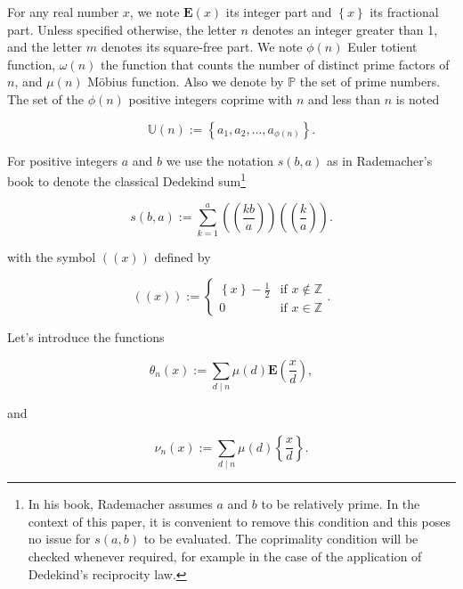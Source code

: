 \documentclass[a4paper,12pt]{article}
\newcommand{\IP}[1]{\textbf{E}\left( #1 \right)}
\newcommand{\FP}[1]{\left\{ #1 \right\}}
\newcommand{\setU}[1]{\mathbb{U}\left( #1 \right)}
\newcommand{\doublepariii}[1]{\left(\!\!\!\left(#1\right)\!\!\!\right)}
\newcommand{\doublepari}[1]{\left(\!\left(#1\right)\!\right)}
\begin{document}
For any real number $x$, we note $\IP{x}$ its integer part and $\FP{x}$ its fractional part. Unless specified otherwise, the letter $n$ denotes an integer greater than 1, and the letter $m$ denotes its square-free part. We note $\phi(n)$ Euler totient function, $\omega(n)$ the function that counts the number of distinct prime factors of $n$, and $\mu(n)$ Möbius function. Also we denote by $\mathbb{P}$ the set of prime numbers. The set of the $\phi(n)$ positive integers coprime with $n$ and less than $n$ is noted

\begin{equation}
\setU{n} := \left\{ a_1, a_2,\ldots, a_{\phi(n)} \right\}.
\label{eq:def_set_U_n}
\end{equation}

For positive integers $a$ and $b$ we use the notation $s(b,a)$ as in Rademacher's book \cite{rademacher1972dedekind} to denote the classical Dedekind sum\footnote{In his book, Rademacher assumes $a$ and $b$ to be relatively prime. In the context of this paper, it is convenient to remove this condition and this poses no issue for $s(a,b)$ to be evaluated. The coprimality condition will be checked whenever required, for example in the case of the application of Dedekind's reciprocity law.}

\begin{equation}
s(b,a):=\sum_{k=1}^a \doublepariii{\frac{kb}{a}}\doublepariii{\frac{k}{a}}.
\label{eq:def_Dedekind_sum}
\end{equation}

with the symbol $\doublepari{x}$ defined by

\begin{equation}\label{eq:def_dp_x}
\doublepari{x} := \left\{
    \begin{array}{ll}
        \FP{x}-\frac{1}{2} & \mbox{if  } x\notin\mathbb{Z} \\
				0                 & \mbox{if  } x\in\mathbb{Z}
    \end{array}
\right. .
\end{equation}

Let's introduce the functions

\begin{equation}
\theta_n(x):=\sum_{d\mid n}\mu(d)\IP{\frac{x}{d}},
\label{eq:def_theta_n_x}
\end{equation}

and

\begin{equation}
\nu_n(x):=\sum_{d\mid n}\mu(d)\FP{\frac{x}{d}}.
\label{eq:def_nu_n_x}
\end{equation}
\end{document}
